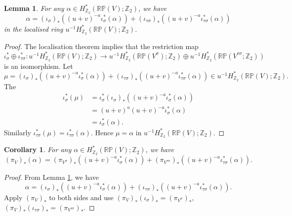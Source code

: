 \documentclass{amsart}
\newtheorem{lemma}[theorem]{Lemma}
\newtheorem{corollary}[theorem]{Corollary}
\theoremstyle{definition}
\theoremstyle{remark}
\numberwithin{equation}{section}
\begin{document}
\begin{lemma}\label{lem:loc}
For any $\alpha \in H^*_{\mathbb{Z}_2}( \mathbb{RP}(V) ; \mathbb{Z}_2)$, we have
\[
\alpha = (\iota_{\sigma})_*( (u+v)^{-a} \iota_{\sigma}^*(\alpha) ) + (\iota_{\tau \sigma})_*( (u+v)^{-a} \iota_{\tau \sigma}^*(\alpha) )
\]
in the localised ring $u^{-1} H^*_{\mathbb{Z}_2}( \mathbb{RP}(V) ; \mathbb{Z}_2)$.

\end{lemma}
\begin{proof}
The localisation theorem \cite[III (3.8)]{die} implies that the restriction map
\[
\iota^*_\sigma \oplus \iota^*_{\tau \sigma} : u^{-1} H^*_{\mathbb{Z}_2}( \mathbb{RP}(V) ; \mathbb{Z}_2) \to u^{-1}H^*_{\mathbb{Z}_2}( \mathbb{RP}(V^\sigma) ; \mathbb{Z}_2) \oplus u^{-1} H^*_{\mathbb{Z}_2}(\mathbb{RP}(V^{\tau\sigma} ; \mathbb{Z}_2))
\]
is an isomorphism. Let
\[
\mu = (\iota_{\sigma})_*( (u+v)^{-a} \iota_{\sigma}^*(\alpha) ) + (\iota_{\tau \sigma})_*( (u+v)^{-a} \iota_{\tau \sigma}^*(\alpha) ) \in u^{-1} H^*_{\mathbb{Z}_2}( \mathbb{RP}(V) ; \mathbb{Z}_2).
\]
The 
\begin{align*}
\iota^*_{\sigma}(\mu) &= \iota_\sigma^* (\iota_\sigma)_* ( (u+v)^{-a} \iota_\sigma^*(\alpha) ) \\
&= (u+v)^a (u+v)^{-a} \iota_\sigma^*(\alpha) \\
&= \iota^*_\sigma(\alpha).
\end{align*}
Similarly $\iota^*_{\tau \sigma}(\mu) = \iota^*_{\tau \sigma}(\alpha)$. Hence $\mu = \alpha$ in $u^{-1} H^*_{\mathbb{Z}_2}( \mathbb{RP}(V) ; \mathbb{Z}_2)$.
\end{proof}

\begin{corollary}\label{cor:loc}
For any $\alpha \in H^*_{\mathbb{Z}_2}(\mathbb{RP}(V) ; \mathbb{Z}_2)$, we have
\[
(\pi_V)_*(\alpha) = (\pi_{V^\sigma})_*( (u+v)^{-a} \iota_{\sigma}^*(\alpha) ) + (\pi_{V^{\tau\sigma}})_*( (u+v)^{-a} \iota_{\tau \sigma}^*(\alpha) ).
\]
\end{corollary}
\begin{proof}
From Lemma \ref{lem:loc}, we have
\[
\alpha = (\iota_{\sigma})_*( (u+v)^{-a} \iota_{\sigma}^*(\alpha) ) + (\iota_{\tau \sigma})_*( (u+v)^{-a} \iota_{\tau \sigma}^*(\alpha) ).
\]
Apply $(\pi_V)_*$ to both sides and use $(\pi_V)_* (\iota_{\sigma})_* = (\pi_{V^\sigma})_*$, $(\pi_V)_* (\iota_{\tau \sigma})_* = (\pi_{V^{\tau \sigma}})_*$.
\end{proof}
\end{document}
